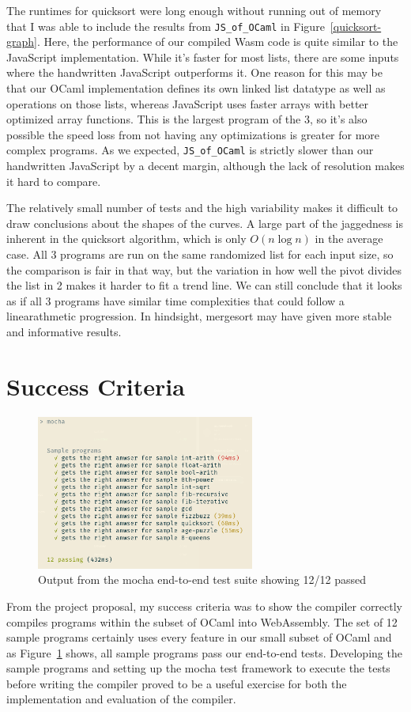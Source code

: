 \documentclass[12pt,a4paper,twoside,openright]{report}
\newcommand{\JSofOCaml}{{\tt JS\_of\_OCaml} }
\begin{document}
The runtimes for quicksort were long enough without running out of memory that I was able to include the results from \JSofOCaml in Figure~\ref{quicksort-graph}.
Here, the performance of our compiled Wasm code is quite similar to the JavaScript implementation.
While it's faster for most lists, there are some inputs where the handwritten JavaScript outperforms it.
One reason for this may be that our OCaml implementation defines its own linked list datatype as well as operations on those lists, whereas JavaScript uses faster arrays with better optimized array functions.
This is the largest program of the 3, so it's also possible the speed loss from not having any optimizations is greater for more complex programs.
As we expected, \JSofOCaml is strictly slower than our handwritten JavaScript by a decent margin, although the lack of resolution makes it hard to compare.

The relatively small number of tests and the high variability makes it difficult to draw conclusions about the shapes of the curves.
A large part of the jaggedness is inherent in the quicksort algorithm, which is only $O(n \log n)$ in the average case.
All 3 programs are run on the same randomized list for each input size, so the comparison is fair in that way, but the variation in how well the pivot divides the list in 2 makes it harder to fit a trend line.
We can still conclude that it looks as if all 3 programs have similar time complexities that could follow a linearathmetic progression.
In hindsight, mergesort may have given more stable and informative results.

\section{Success Criteria}
\begin{figure}[tbh]
   \centerline{\includegraphics[height=2in]{passed-tests}}
\caption{Output from the mocha end-to-end test suite showing 12/12 passed}
\label{passed-tests}
\end{figure}
From the project proposal, my success criteria was to show the compiler correctly compiles programs within the subset of OCaml into WebAssembly.
The set of 12 sample programs certainly uses every feature in our small subset of OCaml and as Figure~\ref{passed-tests} shows, all sample programs pass our end-to-end tests.
Developing the sample programs and setting up the mocha test framework to execute the tests before writing the compiler proved to be a useful exercise for both the implementation and evaluation of the compiler.
\end{document}
